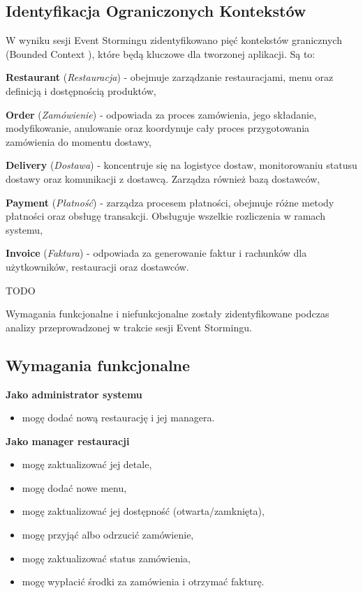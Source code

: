 \subsection{Identyfikacja Ograniczonych Kontekstów}

W wyniku sesji Event Stormingu zidentyfikowano pięć kontekstów granicznych (Bounded Context \cite{boundedcontext}), które będą kluczowe dla tworzonej aplikacji. Są to:

\textbf{Restaurant} (\textit{Restauracja}) - obejmuje zarządzanie restauracjami, menu oraz definicją i dostępnością produktów,

\textbf{Order} (\textit{Zamówienie}) - odpowiada za proces zamówienia, jego składanie, modyfikowanie, anulowanie oraz koordynuje cały proces przygotowania zamówienia do momentu dostawy,

\textbf{Delivery} (\textit{Dostawa}) - koncentruje się na logistyce dostaw, monitorowaniu statusu dostawy oraz komunikacji z dostawcą. Zarządza również bazą dostawców,

\textbf{Payment} (\textit{Płatność}) - zarządza procesem płatności, obejmuje różne metody płatności oraz obsługę transakcji. Obsługuje wszelkie rozliczenia w ramach systemu,

\textbf{Invoice} (\textit{Faktura}) - odpowiada za generowanie faktur i rachunków dla użytkowników, restauracji oraz dostawców.

TODO

Wymagania funkcjonalne i niefunkcjonalne zostały zidentyfikowane podczas analizy przeprowadzonej w trakcie sesji Event Stormingu.

\subsection{Wymagania funkcjonalne}

\textbf{Jako administrator systemu}
\begin{itemize}
    \item mogę dodać nową restaurację i jej managera.
\end{itemize}

\textbf{Jako manager restauracji}
\begin{itemize}
    \item mogę zaktualizować jej detale,
    \item mogę dodać nowe menu,
    \item mogę zaktualizować jej dostępność (otwarta/zamknięta),
    \item mogę przyjąć albo odrzucić zamówienie,
    \item mogę zaktualizować status zamówienia,
    \item mogę wypłacić środki za zamówienia i otrzymać fakturę.
\end{itemize}

